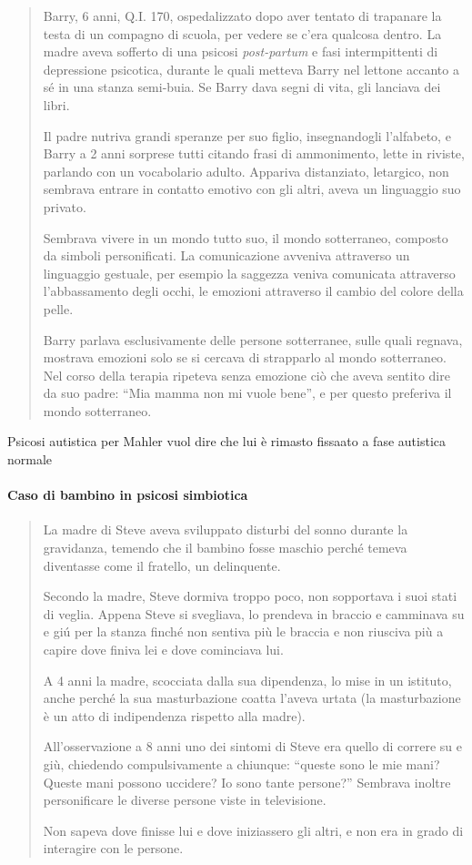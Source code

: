 \documentclass[12pt, a4paper]{article}
\begin{document}
\begin{quote}
    Barry, 6 anni, Q.I. 170, ospedalizzato dopo aver tentato di trapanare la testa di un compagno di scuola, per vedere se c'era qualcosa dentro. La madre aveva sofferto di una psicosi \emph{post-partum} e fasi intermpittenti di depressione psicotica, durante le quali metteva Barry nel lettone accanto a s\'e in una stanza semi-buia. Se Barry dava segni di vita, gli lanciava dei libri.

    Il padre nutriva grandi speranze per suo figlio, insegnandogli l'alfabeto, e Barry a 2 anni sorprese tutti citando frasi di ammonimento, lette in riviste, parlando con un vocabolario adulto. Appariva distanziato, letargico, non sembrava entrare in contatto emotivo con gli altri, aveva un linguaggio suo privato.

    Sembrava vivere in un mondo tutto suo, il mondo sotterraneo, composto da simboli personificati. La comunicazione avveniva attraverso un linguaggio gestuale, per esempio la saggezza veniva comunicata attraverso l'abbassamento degli occhi, le emozioni attraverso il cambio del colore della pelle.

    Barry parlava esclusivamente delle persone sotterranee, sulle quali regnava, mostrava emozioni solo se si cercava di strapparlo al mondo sotterraneo. \\
    Nel corso della terapia ripeteva senza emozione ciò che aveva sentito dire da suo padre: ``Mia mamma non mi vuole bene'', e per questo preferiva il mondo sotterraneo.
\end{quote}
    Psicosi autistica per Mahler vuol dire che lui \`e rimasto fissaato a fase autistica normale

\paragraph{Caso di bambino in psicosi simbiotica}

\begin{quote}
    La madre di Steve aveva sviluppato disturbi del sonno durante la gravidanza, temendo che il bambino fosse maschio perch\'e temeva diventasse come il fratello, un delinquente.

    Secondo la madre, Steve dormiva troppo poco, non sopportava i suoi stati di veglia. Appena Steve si svegliava, lo prendeva in braccio e camminava su e gi\'u per la stanza finch\'e non sentiva pi\`u le braccia e non riusciva pi\`u a capire dove finiva lei e dove cominciava lui. 

    A 4 anni la madre, scocciata dalla sua dipendenza, lo mise in un istituto, anche perch\'e la sua masturbazione coatta l'aveva urtata (la masturbazione \`e un atto di indipendenza rispetto alla madre).

    All'osservazione a 8 anni uno dei sintomi di Steve era quello di correre su e gi\`u, chiedendo compulsivamente a chiunque: ``queste sono le mie mani? Queste mani possono uccidere? Io sono tante persone?''
    Sembrava inoltre personificare le diverse persone viste in televisione.

    Non sapeva dove finisse lui e dove iniziassero gli altri, e non era in grado di interagire con le persone.
\end{quote}
\end{document}

